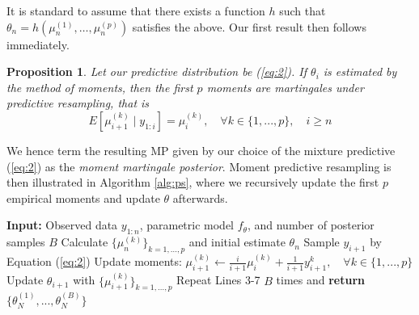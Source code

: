 \documentclass[11pt,a4paper]{article}
\theoremstyle{plain}
\newtheorem{prop}{Proposition}
\theoremstyle{remark}
\theoremstyle{remark}
\begin{document}
It is standard to assume that there exists a function $h$ such that $\theta_n = h(\mu_n^{(1)},\ldots, \mu_n^{(p)})$ satisfies the above. Our first result then follows immediately.
\begin{prop}\label{prop:mom_mart} Let our predictive distribution be  (\ref{eq:2}). If $\theta_i$ is estimated by the method of moments, then the first $p$ moments are martingales under predictive resampling, that is $$E\left[\mu^{(k)}_{i+1}\mid y_{1:i}\right]=\mu^{(k)}_i, \quad \forall k\in\{1,...,p\},\quad i\geq n$$
\end{prop}
 We hence term the resulting MP given by our choice of the mixture predictive (\ref{eq:2}) as the \textit{moment martingale posterior}. Moment predictive resampling is then illustrated in Algorithm \ref{alg:ps}, where we recursively update the first $p$ empirical moments and update $\theta$ afterwards. 

 
\begin{algorithm}[!h]
\caption{Moment Predictive Resampling}\label{alg:ps}
\begin{algorithmic}[1]
\State \textbf{Input:} Observed data $y_{1:n}$, parametric model $f_\theta$, and number of posterior samples $B$
\State Calculate $\{\mu^{(k)}_{n}\}_{k = 1,\ldots,p}$ and initial estimate ${\theta}_{n}$ 
    \State Sample $y_{i+1}$ by Equation (\ref{eq:2})
    \State Update moments:
    $\mu^{(k)}_{i+1} \gets \frac{i}{i+1}\mu^{(k)}_i + \frac{1}{i+1}y_{i+1}^k, \quad \forall k\in\{1,...,p\}$
    \State Update $\theta_{i+1}$ with $\{\mu^{(k)}_{i+1}\}_{k = 1,\ldots,p}$
\EndFor
\State Repeat Lines 3-7 $B$ times and \textbf{return} $\{\theta^{(1)}_N,...,\theta^{(B)}_N\}$
\end{algorithmic}
\end{algorithm}
\end{document}
